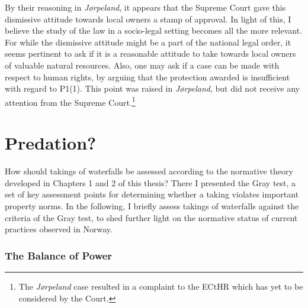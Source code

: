 {By their reasoning in \emph{Jørpeland}, it appears that the Supreme Court gave this dismissive attitude towards local owners a stamp of approval. In light of this, I believe the study of the law in a socio-legal setting becomes all the more relevant. For while the dismissive attitude might be a part of the national legal order, it seems pertinent to ask if it is a reasonable attitude to take towards local owners of valuable natural resources. Also, one may ask if a case can be made with respect to human rights, by arguing that the protection awarded is insufficient with regard to P1(1). This point was raised in \emph{Jørpeland}, but did not receive any attention from the Supreme Court.\footnote{The {\it Jørpeland} case resulted in a complaint to the ECtHR which has yet to be considered by the Court.}
}

\section{Predation?}

How should takings of waterfalls be assessed according to the normative theory developed in Chapters 1 and 2 of this thesis? There I presented the Gray test, a set of key assessment points for determining whether a taking violates important property norms. In the following, I briefly assess takings of waterfalls against the criteria of the Gray test, to shed further light on the normative status of current practices observed in Norway.

\subsubsection{The Balance of Power}

